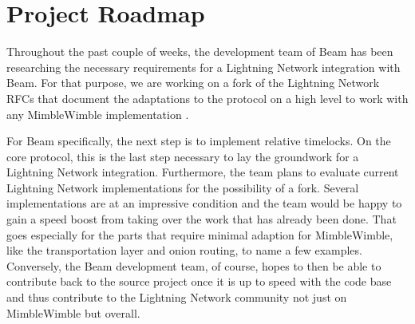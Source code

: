 \documentclass[letterpaper]{article}
\begin{document}
\section{Project Roadmap}
Throughout the past couple of weeks, the development team of Beam has been researching the necessary requirements for a Lightning Network integration with Beam. For that purpose, we are working on a fork of the Lightning Network RFCs that document the adaptations to the protocol on a high level to work with any MimbleWimble implementation \cite{lmw}.

For Beam specifically, the next step is to implement relative timelocks. On the core protocol, this is the last step necessary to lay the groundwork for a Lightning Network integration. Furthermore, the team plans to evaluate current Lightning Network implementations for the possibility of a fork. Several implementations are at an impressive condition and the team would be happy to gain a speed boost from taking over the work that has already been done. That goes especially for the parts that require minimal adaption for MimbleWimble, like the transportation layer and onion routing, to name a few examples. Conversely, the Beam development team, of course, hopes to then be able to contribute back to the source project once it is up to speed with the code base and thus contribute to the Lightning Network community not just on MimbleWimble but overall.

\printbibliography
\end{document}
